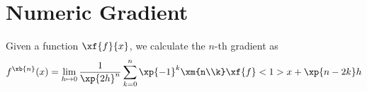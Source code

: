 
\section{Numeric Gradient}

\begin{theorem}
    Given a function $\xf{f}{x}$, we calculate the $n$-th gradient as
    \begin{equation}
        f^{\xb{n}}(x) = \lim_{h \mapsto 0} \frac{1}{\xp{2h}^n} \sum_{k=0}^n \xp{-1}^k \xm{n\\k} \xf{f}<1>{ x + \xp{n-2k} h }
    \end{equation}
\end{theorem}
